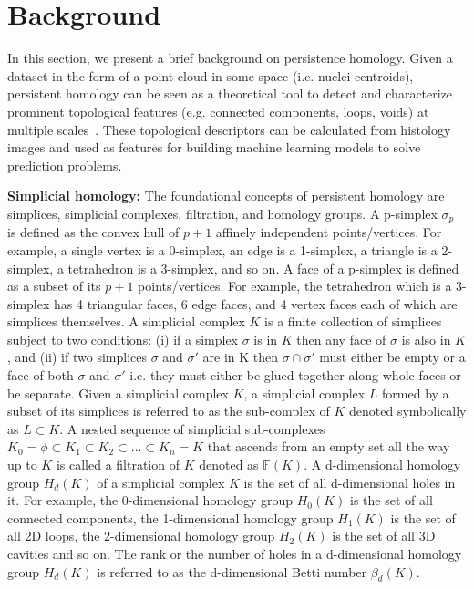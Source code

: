 \documentclass{article}
\begin{document}
\section{Background}
\label{sec:background}
In this section, we present a brief background on persistence homology. Given a dataset in the form of a point cloud in some space (i.e. nuclei centroids), persistent homology can be seen as a theoretical tool to detect and characterize prominent topological features (e.g. connected components, loops, voids) at multiple scales~\cite{Zhu2013}. These topological descriptors can be calculated from histology images and used as features for building machine learning models to solve prediction problems.

\smallskip
\noindent \textbf{Simplicial homology:} The foundational concepts of persistent homology are simplices, simplicial complexes, filtration, and homology groups. A p-simplex $\sigma_p$ is defined as the convex hull of $p+1$ affinely independent points/vertices. For example, a single vertex is a 0-simplex, an edge is a 1-simplex, a triangle is a 2-simplex, a tetrahedron is a 3-simplex, and so on. A face of a p-simplex is defined as a subset of its $p+1$ points/vertices. For example, the tetrahedron which is a 3-simplex has 4 triangular faces, 6 edge faces, and 4 vertex faces each of which are simplices themselves. A simplicial complex $K$ is a finite collection of simplices subject to two conditions: (i) if a simplex $\sigma$ is in $K$ then any face of $\sigma$ is also in $K$, and (ii) if two simplices $\sigma$ and $\sigma'$ are in K then $\sigma \cap \sigma'$ must either be empty or a face of both $\sigma$ and $\sigma'$ i.e. they must either be glued together along whole faces or be separate. Given a simplicial complex $K$, a simplicial complex $L$ formed by a subset of its simplices is referred to as the sub-complex of $K$ denoted symbolically as $L \subset K$. A nested sequence of simplicial sub-complexes $K_0 = \phi \subset K_1 \subset K_2 \subset ... \subset K_n = K$ that ascends from an empty set all the way up to $K$ is called a filtration of $K$ denoted as $\mathbb{F}(K)$. A d-dimensional homology group $H_d(K)$ of a simplicial complex $K$ is the set of all d-dimensional holes in it. For example, the 0-dimensional homology group $H_0(K)$ is the set of all connected components, the 1-dimensional homology group $H_1(K)$ is the set of all 2D loops, the 2-dimensional homology group $H_2(K)$ is the set of all 3D cavities and so on. The rank or the number of holes in a d-dimensional homology group $H_d(K)$ is referred to as the d-dimensional Betti number $\beta_d(K)$. 
\end{document}
